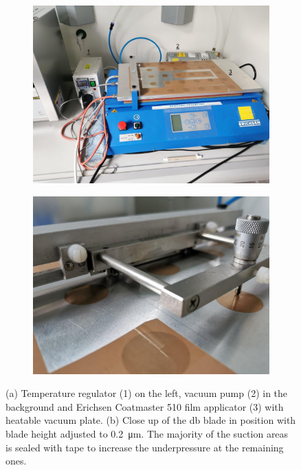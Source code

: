 \documentclass[a4paper]{article}
\begin{document}
\begin{figure}
	\centering
	\begin{subfigure}{.49\textwidth}
		\centering
		\includegraphics[width=.99\textwidth]{Pics/erichsen1.png}
		\caption{}
	\end{subfigure}
	\begin{subfigure}{.49\textwidth}
		\centering
		\includegraphics[width=.99\textwidth]{Pics/erichsendb1.png}
		\caption{}
	\end{subfigure}
	\caption{
		(a)
		Temperature regulator (1) on the left,
		vacuum pump (2) in the background and 
		Erichsen Coatmaster 510 film applicator (3) with heatable vacuum plate.
        (b) Close up of the \gls{db} blade in position with blade height adjusted to \SI{0.2}{\micro\meter}.
		The majority of the suction areas is sealed with tape to increase the underpressure at the remaining ones.
	}
	\label{fig:eric}
\end{figure}
\end{document}
